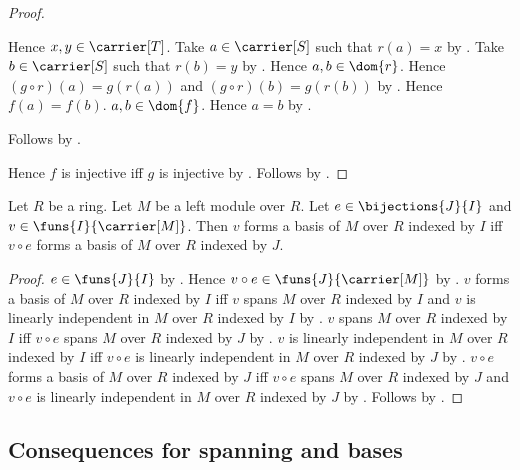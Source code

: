 \begin{proof}
\begin{subproof}
\begin{subproof}
            Hence $x,y\in\carrier[T]$.
            Take $a\in\carrier[S]$ such that $r(a)=x$ by
                .
            Take $b\in\carrier[S]$ such that $r(b)=y$ by
                .
            Hence $a,b\in\dom{r}$.
            Hence $(g\circ r)(a)=g(r(a))$ and
                $(g\circ r)(b)=g(r(b))$ by .
            Hence $f(a)=f(b)$.
            $a,b\in\dom{f}$.
            Hence $a=b$ by .
        \end{subproof}
        Follows by .
    \end{subproof}
    Hence $f$ is injective iff $g$ is injective by \auto.
    Follows by .
\end{proof}

\begin{theorem}\label{indexed_module_basis_reindex}
    Let $R$ be a ring.
    Let $M$ be a left module over $R$.
    Let $e\in\bijections{J}{I}$ and
        $v\in\funs{I}{\carrier[M]}$.
    Then $v$ forms a basis of $M$ over $R$ indexed by $I$ iff
        $v\circ e$ forms a basis of $M$ over $R$ indexed by $J$.
\end{theorem}
\begin{proof}
    $e\in\funs{J}{I}$ by .
    Hence $v\circ e\in\funs{J}{\carrier[M]}$ by
        .
    $v$ forms a basis of $M$ over $R$ indexed by $I$ iff
        $v$ spans $M$ over $R$ indexed by $I$ and
        $v$ is linearly independent in $M$ over $R$ indexed by $I$ by
        .
    $v$ spans $M$ over $R$ indexed by $I$ iff
        $v\circ e$ spans $M$ over $R$ indexed by $J$ by
        .
    $v$ is linearly independent in $M$ over $R$ indexed by $I$ iff
        $v\circ e$ is linearly independent in $M$ over $R$ indexed by $J$ by
        .
    $v\circ e$ forms a basis of $M$ over $R$ indexed by $J$ iff
        $v\circ e$ spans $M$ over $R$ indexed by $J$ and
        $v\circ e$ is linearly independent in $M$ over $R$ indexed by $J$ by
        .
    Follows by \auto.
\end{proof}

\subsection{Consequences for spanning and bases}

